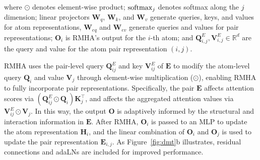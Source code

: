 \vspace{-4mm}
\noindent where $\odot$ denotes element-wise product; $\mathrm{softmax}_j$ denotes softmax along the $j$ dimension; linear projectors $\mathbf{W}_q$, $\mathbf{W}_k$, and $\mathbf{W}_v$ generate queries, keys, and values for atom representations, $\mathbf{W}_{eq}$ and $\mathbf{W}_{ev}$ generate queries and values for pair representations; $\mathbf{O}_i$ is RMHA's output for the $i$-th atom; and $\mathbf{Q}^E_{i,j},\mathbf{V}^E_{i,j}\in \mathbb{R}^{d}$ are the query and value for the atom pair representation $(i,j)$.


RMHA uses the pair-level query $\mathbf{Q}^E_{ij}$ and key $\mathbf{V}^E_{ij}$ of $\mathbf{E}$ to modify the atom-level query $\mathbf{Q}_i$ and value $\mathbf{V}_j$ through element-wise multiplication ($\odot$), enabling RMHA to fully incorporate pair representations. Specifically, the pair $\mathbf{E}$ affects attention scores via $(\mathbf{Q}^E_{ij} \odot \mathbf{Q}_i) \mathbf{K}_j^\top$, and affects the aggregated attention values via $\mathbf{V}^E_{ij} \odot \mathbf{V}_j$. In this way, the output $\mathbf{O}$ is adaptively informed by the structural and interaction information in $\mathbf{E}$. After RMHA, $\mathbf{O}_i$ is passed to an MLP to update the atom representation $\mathbf{H}_i$, and the linear combination of $\mathbf{O}_i$ and $\mathbf{O}_j$ is used to update the pair representation $\mathbf{E}_{i,j}$. As Figure~\ref{fig:dmt}b illustrates, residual connections and adaLNs are included for improved performance.

